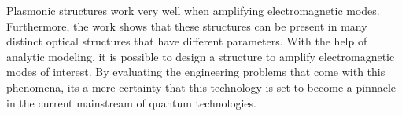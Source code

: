 Plasmonic structures work very well when amplifying electromagnetic modes. Furthermore, the work shows that these structures can be present in many distinct optical structures that have different parameters. With the help of analytic modeling, it is possible to design a structure to amplify electromagnetic modes of interest. By evaluating the engineering problems that come with this phenomena, its a mere certainty that this technology is set to become a pinnacle in the current mainstream of quantum technologies.\\
